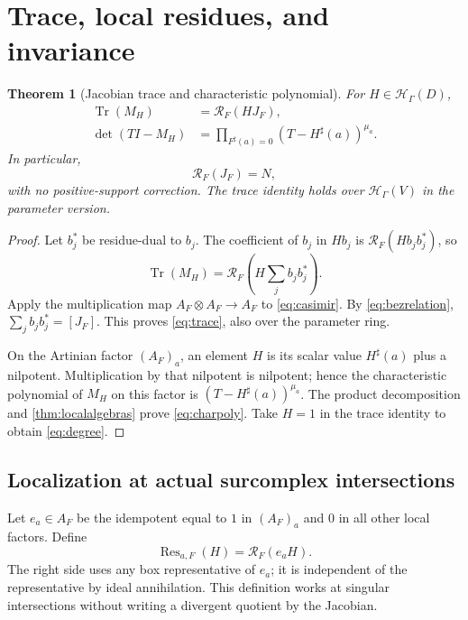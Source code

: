 \documentclass[11pt,letterpaper]{article}
\newtheorem{theorem}{Theorem}[section]
\theoremstyle{definition}
\theoremstyle{remark}
\newcommand{\HH}{\mathcal H}
\newcommand{\RR}{\mathscr R}
\newcommand{\sh}{^{\sharp}}
\newcommand{\Tr}{\operatorname{Tr}}
\newcommand{\Res}{\operatorname{Res}}
\numberwithin{equation}{section}
\begin{document}
\section{Trace, local residues, and invariance}\label{sec:trace}
\begin{theorem}[Jacobian trace and characteristic polynomial]\label{thm:trace}
For $H\in\HH_\Gamma(D)$,
\begin{align}
 \Tr(M_H)&=\RR_F(HJ_F),\label{eq:trace}\\
 \det(TI-M_H)&=\prod_{F\sh(a)=0}(T-H\sh(a))^{\mu_a}.
 \label{eq:charpoly}
\end{align}
In particular,
\begin{equation}\label{eq:degree}
 \RR_F(J_F)=N,
\end{equation}
with no positive-support correction. The trace identity holds over $\HH_\Gamma(V)$ in the parameter version.
\end{theorem}
\begin{proof}
Let $b_j^*$ be residue-dual to $b_j$. The coefficient of $b_j$ in $Hb_j$ is $\RR_F(Hb_jb_j^*)$, so
\[
 \Tr(M_H)=\RR_F\!\left(H\sum_jb_jb_j^*\right).
\]
Apply the multiplication map $A_F\otimes A_F\to A_F$ to \eqref{eq:casimir}. By \eqref{eq:bezrelation}, $\sum_jb_jb_j^*=[J_F]$. This proves \eqref{eq:trace}, also over the parameter ring.

On the Artinian factor $(A_F)_a$, an element $H$ is its scalar value $H\sh(a)$ plus a nilpotent. Multiplication by that nilpotent is nilpotent; hence the characteristic polynomial of $M_H$ on this factor is $(T-H\sh(a))^{\mu_a}$. The product decomposition and \cref{thm:localalgebras} prove \eqref{eq:charpoly}. Take $H=1$ in the trace identity to obtain \eqref{eq:degree}.
\end{proof}

\subsection{Localization at actual surcomplex intersections}
Let $e_a\in A_F$ be the idempotent equal to $1$ in $(A_F)_a$ and $0$ in all other local factors. Define
\begin{equation}\label{eq:localized}
 \Res_{a,F}(H)=\RR_F(e_aH).
\end{equation}
The right side uses any box representative of $e_a$; it is independent of the representative by ideal annihilation. This definition works at singular intersections without writing a divergent quotient by the Jacobian.
\end{document}
